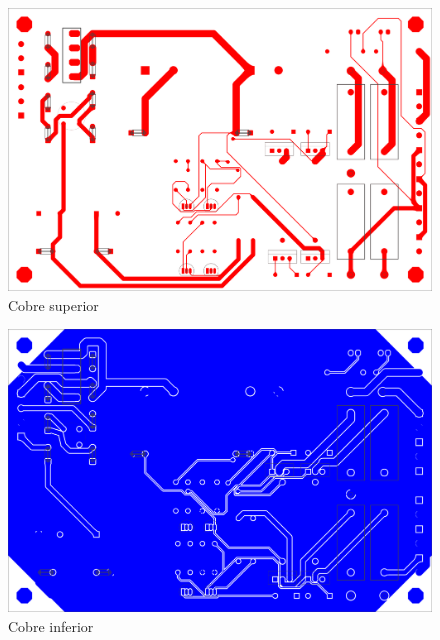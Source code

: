 \clearpage

\begin{figure}[H]
    \centering
    \includegraphics[width=150mm, angle=90]{img/PCB/layers/power_supply/top-copper.png}
    \caption{\footnotesize{Cobre superior}}
    \label{fig:pcb_preamp_top_copper}
\end{figure}

\clearpage

\begin{figure}[H]
    \centering
    \includegraphics[width=150mm, angle=90]{img/PCB/layers/power_supply/bottom-copper.png}
    \caption{\footnotesize{Cobre inferior}}
    \label{fig:pcb_preamp_bottom_copper}
\end{figure}

\clearpage

